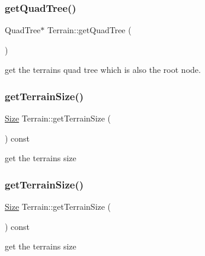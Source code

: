 \subsubsection{\texorpdfstring{get\+Quad\+Tree()}{getQuadTree()}\hspace{0.1cm}{\footnotesize\ttfamily [2/2]}}
{\footnotesize\ttfamily Quad\+Tree$\ast$ Terrain\+::get\+Quad\+Tree (\begin{DoxyParamCaption}{ }\end{DoxyParamCaption})}

get the terrain\textquotesingle{}s quad tree which is also the root node. \mbox{\label{classTerrain_ae1fb00c2c35c35fd5e0274e037c624a2}} 
\subsubsection{\texorpdfstring{get\+Terrain\+Size()}{getTerrainSize()}\hspace{0.1cm}{\footnotesize\ttfamily [1/2]}}
{\footnotesize\ttfamily \hyperlink{classSize}{Size} Terrain\+::get\+Terrain\+Size (\begin{DoxyParamCaption}{ }\end{DoxyParamCaption}) const\hspace{0.3cm}{\ttfamily [inline]}}

get the terrain\textquotesingle{}s size \mbox{\label{classTerrain_ae1fb00c2c35c35fd5e0274e037c624a2}} 
\subsubsection{\texorpdfstring{get\+Terrain\+Size()}{getTerrainSize()}\hspace{0.1cm}{\footnotesize\ttfamily [2/2]}}
{\footnotesize\ttfamily \hyperlink{classSize}{Size} Terrain\+::get\+Terrain\+Size (\begin{DoxyParamCaption}{ }\end{DoxyParamCaption}) const\hspace{0.3cm}{\ttfamily [inline]}}

get the terrain\textquotesingle{}s size \mbox{\label{classTerrain_a4217303ce95e5a1d0d591dd2ce178623}} 
